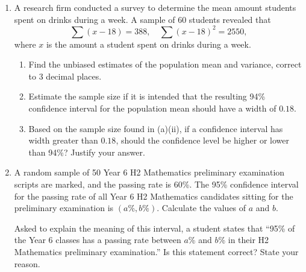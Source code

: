 \begin{problem}
    \begin{enumerate}
        \item A research firm conducted a survey to determine the mean amount students spent on drinks during a week. A sample of 60 students revealed that \[\sum (x - 18) = 388, \quad \sum (x - 18)^2 = 2550,\] where $x$ is the amount a student spent on drinks during a week.
        \begin{enumerate}
            \item Find the unbiased estimates of the population mean and variance, correct to 3 decimal places.
            \item Estimate the sample size if it is intended that the resulting 94\% confidence interval for the population mean should have a width of $0.18$.
            \item Based on the sample size found in (a)(ii), if a confidence interval has width greater than $0.18$, should the confidence level be higher or lower than 94\%? Justify your answer.
        \end{enumerate}
        \item A random sample of 50 Year 6 H2 Mathematics preliminary examination scripts are marked, and the passing rate is 60\%. The 95\% confidence interval for the passing rate of all Year 6 H2 Mathematics candidates sitting for the preliminary examination is $(a\%, b\%)$. Calculate the values of $a$ and $b$.

        Asked to explain the meaning of this interval, a student states that ``95\% of the Year 6 classes has a passing rate between $a$\% and $b$\% in their H2 Mathematics preliminary examination.'' Is this statement correct? State your reason.
    \end{enumerate}
\end{problem}
\clearpage
